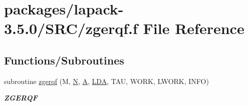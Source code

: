 \hypertarget{zgerqf_8f}{}\section{packages/lapack-\/3.5.0/\+S\+R\+C/zgerqf.f File Reference}
\label{zgerqf_8f}
\subsection*{Functions/\+Subroutines}
\begin{DoxyCompactItemize}
\item 
subroutine \hyperlink{group__complex16GEcomputational_ga4be039758e15ce6dfd29e36d63a01ad7}{zgerqf} (M, \hyperlink{polmisc_8c_a0240ac851181b84ac374872dc5434ee4}{N}, \hyperlink{classA}{A}, \hyperlink{example__user_8c_ae946da542ce0db94dced19b2ecefd1aa}{L\+D\+A}, T\+A\+U, W\+O\+R\+K, L\+W\+O\+R\+K, I\+N\+F\+O)
\begin{DoxyCompactList}\small\item\em {\bfseries Z\+G\+E\+R\+Q\+F} \end{DoxyCompactList}\end{DoxyCompactItemize}
